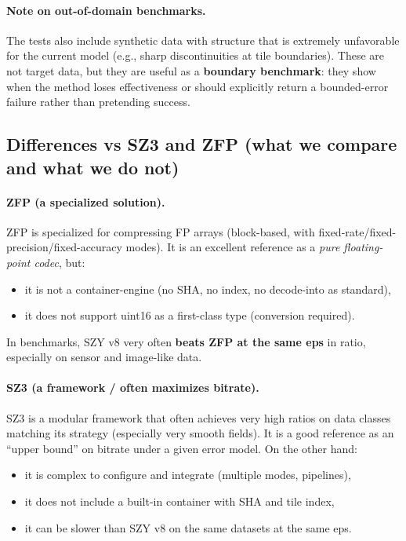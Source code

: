 \documentclass[11pt,a4paper]{article}
\begin{document}
\paragraph{Note on out-of-domain benchmarks.}
The tests also include synthetic data with structure that is extremely unfavorable for the current model (e.g., sharp discontinuities at tile boundaries). These are not target data, but they are useful as a \textbf{boundary benchmark}: they show when the method loses effectiveness or should explicitly return a bounded-error failure rather than pretending success.

\subsection{Differences vs SZ3 and ZFP (what we compare and what we do not)}
\paragraph{ZFP (a specialized solution).}
ZFP \cite{zfp} is specialized for compressing FP arrays (block-based, with fixed-rate/fixed-precision/fixed-accuracy modes). It is an excellent reference as a \emph{pure floating-point codec}, but:
\begin{itemize}
  \item it is not a container-engine (no SHA, no index, no decode-into as standard),
  \item it does not support uint16 as a first-class type (conversion required).
\end{itemize}
In benchmarks, SZY v8 very often \textbf{beats ZFP at the same eps} in ratio, especially on sensor and image-like data.

\paragraph{SZ3 (a framework / often maximizes bitrate).}
SZ3 \cite{sz3} is a modular framework that often achieves very high ratios on data classes matching its strategy (especially very smooth fields). It is a good reference as an ``upper bound'' on bitrate under a given error model.
On the other hand:
\begin{itemize}
  \item it is complex to configure and integrate (multiple modes, pipelines),
  \item it does not include a built-in container with SHA and tile index,
  \item it can be slower than SZY v8 on the same datasets at the same eps.
\end{itemize}
\end{document}
